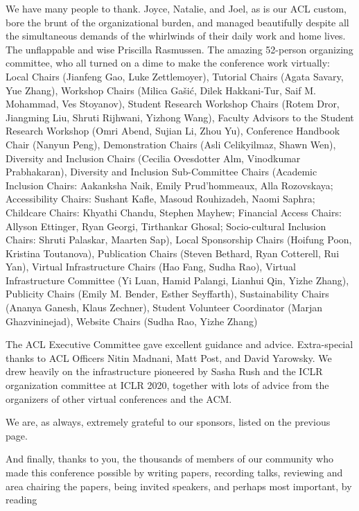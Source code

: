 \documentclass[11pt]{article}
\begin{document}
We have many people to thank.  Joyce, Natalie, and Joel, as is our ACL custom,
bore the brunt of the organizational burden, and managed beautifully despite all the
simultaneous demands of the whirlwinds of their daily
work and home lives.  The unflappable and wise Priscilla Rasmussen.
The amazing 52-person organizing committee, who all turned on a dime
to make the conference work virtually: Local Chairs (Jianfeng Gao, Luke Zettlemoyer), Tutorial Chairs (Agata Savary, Yue Zhang),
Workshop Chairs (Milica Ga\v{s}i\'{c}, Dilek Hakkani-Tur, Saif M. Mohammad, Ves Stoyanov),
Student Research Workshop Chairs (Rotem Dror, Jiangming Liu, Shruti Rijhwani, Yizhong Wang),
Faculty Advisors to the Student Research Workshop (Omri Abend, Sujian Li, Zhou Yu),
Conference Handbook Chair (Nanyun Peng),
Demonstration Chairs (Asli Celikyilmaz, Shawn Wen),
Diversity and Inclusion Chairs (Cecilia Ovesdotter Alm, Vinodkumar Prabhakaran),
Diversity and Inclusion Sub-Committee Chairs (Academic Inclusion Chairs: Aakanksha Naik, Emily Prud'hommeaux, Alla Rozovskaya;
Accessibility Chairs: Sushant Kafle, Masoud Rouhizadeh, Naomi Saphra;
Childcare Chairs: Khyathi Chandu, Stephen Mayhew;
Financial Access Chairs: Allyson Ettinger, Ryan Georgi, Tirthankar Ghosal;
Socio-cultural Inclusion Chairs: Shruti Palaskar, Maarten Sap),
Local Sponsorship Chairs (Hoifung Poon, Kristina Toutanova),
Publication Chairs (Steven Bethard, Ryan Cotterell, Rui Yan),
Virtual Infrastructure Chairs (Hao Fang, Sudha Rao),
Virtual Infrastructure Committee (Yi Luan, Hamid Palangi, Lianhui Qin, Yizhe Zhang),
Publicity Chairs (Emily M. Bender, Esther Seyffarth),
Sustainability Chairs (Ananya Ganesh, Klaus Zechner),
Student Volunteer Coordinator (Marjan Ghazvininejad),
Website Chairs (Sudha Rao, Yizhe Zhang)

The ACL Executive Committee gave excellent guidance and advice. Extra-special thanks to
ACL Officers Nitin Madnani, Matt Post,  and David Yarowsky.
We drew heavily on the infrastructure pioneered by Sasha Rush and
the ICLR organization committee at ICLR 2020, together with lots
of advice from the organizers of other virtual conferences and the
ACM.

We are, as always, extremely grateful to our sponsors, listed on the previous page.

And finally, thanks to you, the thousands of members of our community
who made this conference possible by writing papers, recording talks, reviewing and area chairing the papers,
being invited speakers, and perhaps most important, by reading
\end{document}
